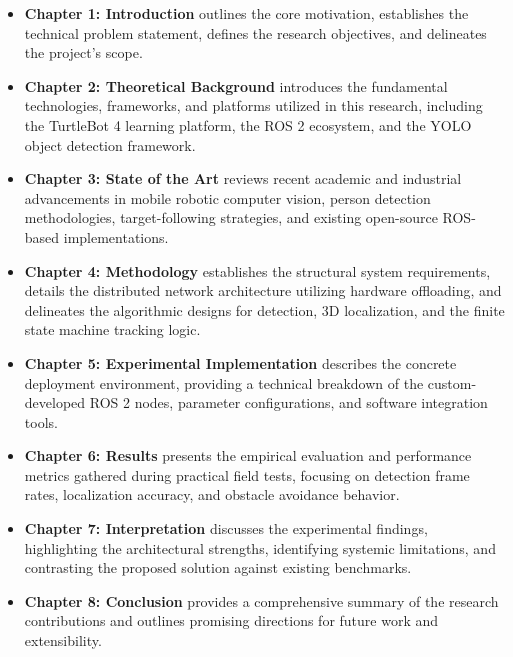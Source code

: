 \begin{itemize}
	\item \textbf{Chapter 1: Introduction} outlines the core motivation, establishes the technical problem statement, defines the research objectives, and delineates the project's scope.
	\item \textbf{Chapter 2: Theoretical Background} introduces the fundamental technologies, frameworks, and platforms utilized in this research, including the TurtleBot 4 learning platform, the ROS 2 ecosystem, and the YOLO object detection framework.
	\item \textbf{Chapter 3: State of the Art} reviews recent academic and industrial advancements in mobile robotic computer vision, person detection methodologies, target-following strategies, and existing open-source ROS-based implementations.
	\item \textbf{Chapter 4: Methodology} establishes the structural system requirements, details the distributed network architecture utilizing hardware offloading, and delineates the algorithmic designs for detection, 3D localization, and the finite state machine tracking logic.
	\item \textbf{Chapter 5: Experimental Implementation} describes the concrete deployment environment, providing a technical breakdown of the custom-developed ROS 2 nodes, parameter configurations, and software integration tools.
	\item \textbf{Chapter 6: Results} presents the empirical evaluation and performance metrics gathered during practical field tests, focusing on detection frame rates, localization accuracy, and obstacle avoidance behavior.
	\item \textbf{Chapter 7: Interpretation} discusses the experimental findings, highlighting the architectural strengths, identifying systemic limitations, and contrasting the proposed solution against existing benchmarks.
	\item \textbf{Chapter 8: Conclusion} provides a comprehensive summary of the research contributions and outlines promising directions for future work and extensibility.
\end{itemize}


 